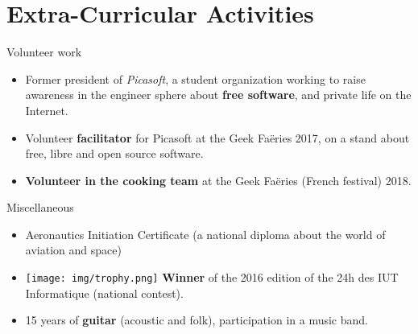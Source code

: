 \documentclass[a4paper]{twentysecondcv} %
\begin{document}
\section{Extra-Curricular Activities}
\begin{twenty}
    \twentyitem
    	{}
		{}
        {Volunteer work}
        {}
        {}
        {\begin{itemize}
        \item Former president of \textit{Picasoft}, a student organization working to raise awareness in the engineer sphere about \textbf{free software}, and private life on the Internet.
        \item Volunteer \textbf{facilitator} for Picasoft at the Geek Faëries 2017, on a stand about free, libre and open source software.
        \item \textbf{Volunteer in the cooking team} at the Geek Faëries (French festival) 2018.
        \end{itemize}}
    \twentyitem
        {}
                {}
        {Miscellaneous}
        {}
        {}
        {\begin{itemize}
        \item Aeronautics Initiation Certificate (a national diploma about the world of aviation and space)
        \item \texttt{[image: img/trophy.png]} \textbf{Winner} of the 2016 edition of the 24h des IUT Informatique (national contest).
        \item 15 years of \textbf{guitar} (acoustic and folk), participation in a music band.
        \end{itemize}}
\end{twenty}
\end{document}
